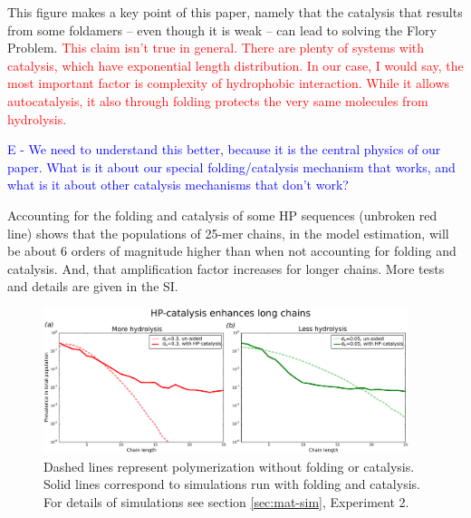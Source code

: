 \documentclass[journal=jacsat,manuscript=article,layout=twocolumn]{achemso}
\newcommand*{\red}[1]{\textcolor{red}{#1}}
\newcommand*{\blue}[1]{\textcolor{blue}{#1}}
\begin{document}
This figure makes a key point of this paper, namely that the catalysis that results from some 
foldamers -- even though it is weak -- can lead to solving the Flory Problem. \red{This claim isn't 
true in general. There are plenty of systems with catalysis, which have exponential length 
distribution. In our case, I would say, the most important factor is 
complexity of hydrophobic interaction. While it allows autocatalysis, it also through folding 
protects the very same molecules from hydrolysis.}

\blue{E - We need to understand this better, because it is the central physics of our paper. 
What is it about our special folding/catalysis mechanism that works, and what is it about other 
catalysis mechanisms that don't work?}

Accounting for the folding and catalysis of some HP sequences (unbroken red line) shows that the 
populations of 25-mer chains, in the model estimation, will be about 6 orders of magnitude higher 
than when not accounting for folding and catalysis.  And, that amplification factor increases for 
longer chains.  
More tests and details are given in the SI.
\begin{figure}[h!]
  \centering
  \includegraphics[width=0.95\textwidth]{pictures/flory-and-hp.pdf} 
  \caption{Dashed lines represent polymerization without folding or catalysis. Solid lines 
correspond to simulations run with folding and catalysis. For details of simulations see 
section \ref{sec:mat-sim}, Experiment 2. }
  \label{fig:sim.flory-fold}
\end{figure}
\end{document}
